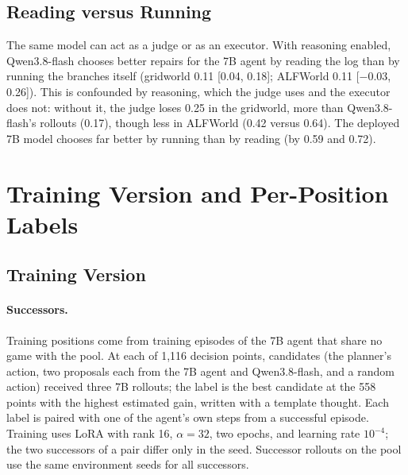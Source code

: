 \documentclass{article}
\theoremstyle{plain}
\theoremstyle{definition}
\theoremstyle{remark}
\begin{document}
\subsection{Reading versus Running}
\label{app:extra}

The same model can act as a judge or as an executor. With reasoning enabled, Qwen3.8-flash chooses better repairs for the 7B agent by reading the log than by running the branches itself (gridworld 0.11 [0.04, 0.18]; ALFWorld 0.11 [$-$0.03, 0.26]). This is confounded by reasoning, which the judge uses and the executor does not: without it, the judge loses 0.25 in the gridworld, more than Qwen3.8-flash's rollouts (0.17), though less in ALFWorld (0.42 versus 0.64). The deployed 7B model chooses far better by running than by reading (by 0.59 and 0.72).

\section{Training Version and Per-Position Labels}
\label{app:version}

\subsection{Training Version}
\label{app:training}

\paragraph{Successors.}
Training positions come from training episodes of the 7B agent that share no game with the pool. At each of 1,116 decision points, candidates (the planner's action, two proposals each from the 7B agent and Qwen3.8-flash, and a random action) received three 7B rollouts; the label is the best candidate at the 558 points with the highest estimated gain, written with a template thought. Each label is paired with one of the agent's own steps from a successful episode. Training uses LoRA with rank 16, $\alpha=32$, two epochs, and learning rate $10^{-4}$; the two successors of a pair differ only in the seed. Successor rollouts on the pool use the same environment seeds for all successors.
\end{document}
